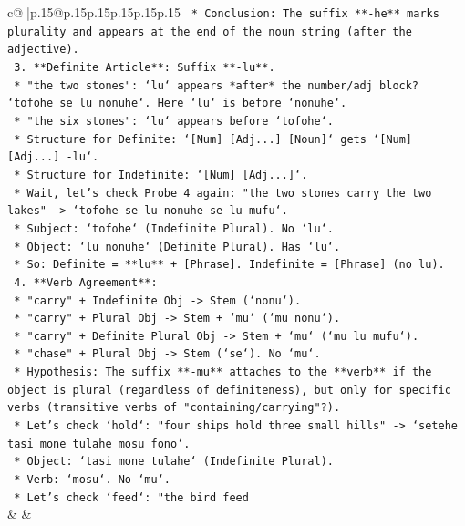 \documentclass{article}
\begin{document}
{\begin{supertabular}{c@{$\;$}|p{.15\linewidth}@{}p{.15\linewidth}p{.15\linewidth}p{.15\linewidth}p{.15\linewidth}p{.15\linewidth}}
{{{\texttt{        *   Conclusion: The suffix **{-}he** marks plurality and appears at the end of the noun string (after the adjective).} \\
\texttt{    3.  **Definite Article**: Suffix **{-}lu**.} \\
\texttt{        *   "the two stones": `lu` appears *after* the number/adj block? `tofohe se lu nonuhe`. Here `lu` is before `nonuhe`.} \\
\texttt{        *   "the six stones": `lu` appears before `tofohe`.} \\
\texttt{        *   Structure for Definite: `{[}Num{]} {[}Adj...{]} {[}Noun{]}` gets `{[}Num{]} {[}Adj...{]} {-}lu`.} \\
\texttt{        *   Structure for Indefinite: `{[}Num{]} {[}Adj...{]}`.} \\
\texttt{        *   Wait, let's check Probe 4 again: "the two stones carry the two lakes" {-}> `tofohe se lu nonuhe se lu mufu`.} \\
\texttt{        *   Subject: `tofohe` (Indefinite Plural). No `lu`.} \\
\texttt{        *   Object: `lu nonuhe` (Definite Plural). Has `lu`.} \\
\texttt{        *   So: Definite = **lu** + {[}Phrase{]}. Indefinite = {[}Phrase{]} (no lu).} \\
\texttt{    4.  **Verb Agreement**:} \\
\texttt{        *   "carry" + Indefinite Obj {-}> Stem (`nonu`).} \\
\texttt{        *   "carry" + Plural Obj {-}> Stem + `mu` (`mu nonu`).} \\
\texttt{        *   "carry" + Definite Plural Obj {-}> Stem + `mu` (`mu lu mufu`).} \\
\texttt{        *   "chase" + Plural Obj {-}> Stem (`se`). No `mu`.} \\
\texttt{        *   Hypothesis: The suffix **{-}mu** attaches to the **verb** if the object is plural (regardless of definiteness), but only for specific verbs (transitive verbs of "containing/carrying"?).} \\
\texttt{        *   Let's check `hold`: "four ships hold three small hills" {-}> `setehe tasi mone tulahe mosu fono`.} \\
\texttt{            *   Object: `tasi mone tulahe` (Indefinite Plural).} \\
\texttt{            *   Verb: `mosu`. No `mu`.} \\
\texttt{        *   Let's check `feed`: "the bird feed} \\
            }
        }
    }
    & & \\ \\


\end{supertabular}}
\end{document}
